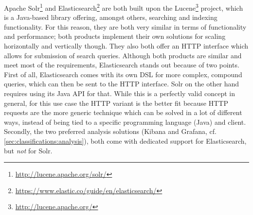 \begin{table}[t]
\centering
\caption[Classification of data aggregation solutions]{Classification of data aggregation solutions. Support for arbitrary data structures, search capabilities, and combination of aggregations is not considered here since all solutions fulfill this requirement.}
\label{table:classifications:aggregation}
\end{table}

Apache Solr\footnote{\url{http://lucene.apache.org/solr/}} and Elasticsearch\footnote{\url{https://www.elastic.co/guide/en/elasticsearch/}} are both built upon the Lucene\footnote{\url{http://lucene.apache.org/}} project, which is a Java-based library offering, amongst others, searching and indexing functionality.
For this reason, they are both very similar in terms of functionality and performance; both products implement their own solutions for scaling horizontally and vertically though.
They also both offer an HTTP interface which allows for submission of search queries.
Although both products are similar and meet most of the requirements, Elasticsearch stands out because of two points. 
First of all, Elasticsearch comes with its own \ac{DSL} for more complex, compound queries, which can then be sent to the HTTP interface.
Solr on the other hand requires using its Java API for that.
While this is a perfectly valid concept in general, for this use case the HTTP variant is the better fit because HTTP requests are the more generic technique which can be solved in a lot of different ways, instead of being tied to a specific programming language (Java) and client.
Secondly, the two preferred analysis solutions (Kibana and Grafana, cf. \cref{sec:classifications:analysis}), both come with dedicated support for Elasticsearch, but \emph{not} for Solr.

